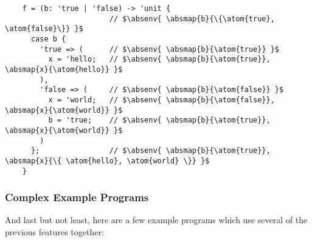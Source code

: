 \documentclass[12pt,twoside]{report}
\begin{document}
\begin{listing}[H]
  \begin{verbatim}
    f = (b: 'true | 'false) -> 'unit {
                        // $\absenv{ \absmap{b}{\{\atom{true}, \atom{false}\}} }$
      case b {
        'true => (      // $\absenv{ \absmap{b}{\atom{true}} }$
          x = 'hello;   // $\absenv{ \absmap{b}{\atom{true}}, \absmap{x}{\atom{hello}} }$
        ),
        'false => (     // $\absenv{ \absmap{b}{\atom{false}} }$
          x = 'world;   // $\absenv{ \absmap{b}{\atom{false}}, \absmap{x}{\atom{world}} }$
          b = 'true;    // $\absenv{ \absmap{b}{\atom{true}}, \absmap{x}{\atom{world}} }$ 
        )
      };                // $\absenv{ \absmap{b}{\atom{true}}, \absmap{x}{\{ \atom{hello}, \atom{world} \}} }$
    }
  \end{verbatim}
  \caption{Each branch of the case statement is abstractly interpreted with  narrowed down to a single atom (lines 4 and 7). Both branches modify , but to different values which make their environments different (lines 5 and 8); these different values are unioned together in the final environment to $\{\atom{hello}, \atom{world}\}$. The false branch happens to mutate  back to $\atom{true}$, which means by the end of \textit{both} branches, $b: \atom{true}$, which is reflected in the final environment which maps  to $\atom{true}$ instead of $\{\atom{true}, \atom{false}\}$.}
\end{listing}

\subsubsection{Complex Example Programs}
And last but not least, here are a few example programs which use several of the previous features together:

\cleardoublepage
\end{document}

